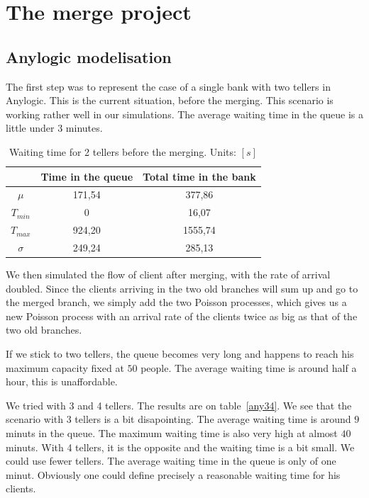 \documentclass[12pt,a4paper,notitlepage]{report}
\begin{document}
\section*{The merge project}
\subsection*{Anylogic modelisation}

The first step was to represent the case of a single bank with two tellers in Anylogic. This is the current situation, before the merging. This scenario is working rather well in our simulations. The average waiting time in the queue is a little under $3$ minutes. 


\begin{table}[h]
\centering
\begin{tabular}{|c|c|c|}
\hline 
 & Time in the queue & Total time in the bank \\ 
\hline 
$\mu$ & 171,54 & 377,86 \\ 
\hline 
$T_{min}$ & 0 & 16,07 \\ 
\hline 
$T_{max}$ & 924,20 & 1555,74 \\ 
\hline 
$\sigma$ & 249,24  & 285,13 \\ 
\hline 
\end{tabular} 
\caption{Waiting time for 2 tellers before the merging. Units: $[s]$}
\end{table}

We then simulated the flow of client after merging, with the rate of arrival doubled. 
Since the clients arriving in the two old branches will sum up and go to the merged branch, we simply add the two Poisson processes, which gives us a new Poisson process with an arrival rate of the clients twice as big as that of the two old branches.

If we stick to two tellers, the queue becomes very long and happens to reach his maximum capacity fixed at $50$ people. The average waiting time is around half a hour, this is unaffordable.

We tried with 3 and 4 tellers. The results are on table~\ref{any34}. We see that the scenario with 3 tellers is a bit disapointing. The average waiting time is around $9$ minuts in the queue. The maximum waiting time is also very high at almost $40$ minuts. 
With 4 tellers, it is the opposite and the waiting time is a bit small. We could use fewer tellers. The average waiting time in the queue is only of one minut. Obviously one could define precisely a reasonable waiting time for his clients.
\end{document}
